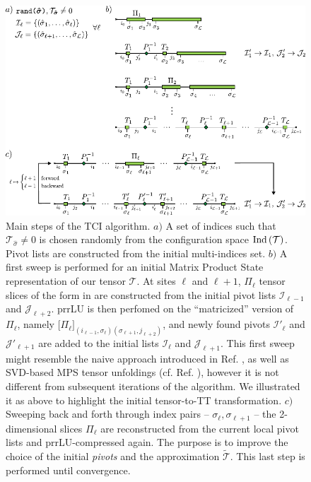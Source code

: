 \begin{figure}[htbp]
	\centering
	\includegraphics[width=\textwidth]{figures/TCI.pdf}
	\caption{Main steps of the TCI algorithm. $a)$ A set of indices such that $\mathcal{T}_{\hat \sigma} \neq 0$ is chosen randomly from the configuration space $\text{Ind}\left(\mathcal{T}\right)$. Pivot lists are constructed from the initial multi-indices set. $b)$ A first sweep is performed for an initial Matrix Product State representation of our tensor $\mathcal{T}$. At sites $\ell$ and $\ell+1$, $\Pi_\ell$ tensor slices of the form in  are constructed from the initial pivot lists $\mathcal{I}_{\ell-1}$ and $\mathcal{J}_{\ell+2}$. prrLU is then perfomed on the ``matricized'' version of $\Pi_\ell$, namely $\bigl[\Pi_\ell\bigr]_{(i_{\ell -1}, \sigma_\ell) (\sigma_{\ell+1}, j_{\ell +2})}$, and newly found pivots $\mathcal{I}'_\ell$ and $\mathcal{J}'_{\ell+1}$ are added to the initial lists $\mathcal{I}_\ell$ and $\mathcal{J}_{\ell+1}$. This first sweep might resemble the naive approach introduced in Ref. \cite{Fernandez2022}, as well as SVD-based MPS tensor unfoldings (cf. Ref. \cite{vonDelftTNNotes}), however it is not different from subsequent iterations of the algorithm. We illustrated it as above to highlight the initial tensor-to-TT transformation. $c)$ Sweeping back and forth through index pairs -- $\sigma_\ell, \sigma_{\ell +1}$ -- the 2-dimensional slices $\Pi_\ell$ are reconstructed from the current local pivot lists and prrLU-compressed again. The purpose is to improve the choice of the initial \textit{pivots} and the approximation $\widetilde{\mathcal{T}}$. This last step is performed until convergence.}
	\label{fig:TCIalg}
\end{figure}

